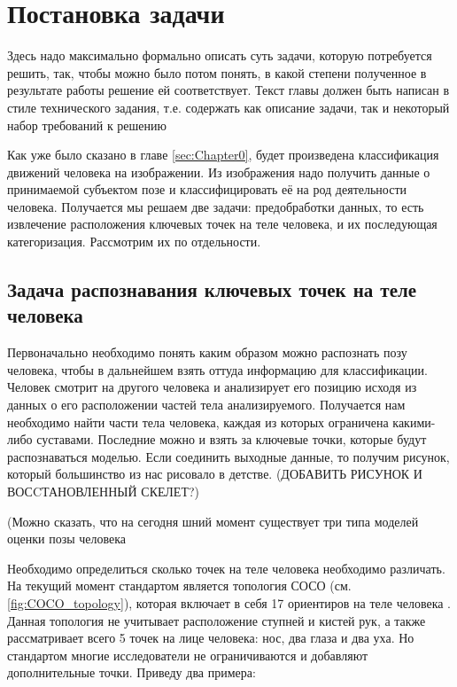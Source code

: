 \section{Постановка задачи}
\label{sec:Chapter1} 
Здесь надо максимально формально описать суть задачи, которую потребуется решить, так, чтобы можно было потом понять, в какой степени полученное в результате работы решение ей соответствует. Текст главы должен быть написан в стиле технического задания, т.е. содержать как описание задачи, так и некоторый набор требований к решению

Как уже было сказано в главе \ref{sec:Chapter0}, будет произведена классификация движений человека на изображении. Из изображения надо получить данные о принимаемой субъектом позе и классифицировать её на род деятельности человека. Получается мы решаем две задачи: предобработки данных, то есть извлечение расположения ключевых точек на теле человека, и их последующая категоризация. Рассмотрим их по отдельности.


\subsection{Задача распознавания ключевых точек на теле человека}
\label{subsec:Theory of keypoint detection}

Первоначально необходимо понять каким образом можно распознать позу человека, чтобы в дальнейшем взять оттуда информацию для классификации. Человек смотрит на другого человека и анализирует его позицию исходя из данных о его расположении частей тела анализируемого. Получается нам необходимо найти части тела человека, каждая из которых ограничена какими-либо суставами. Последние можно и взять за ключевые точки, которые будут распознаваться моделью. Если соединить выходные данные, то получим рисунок, который большинство из нас рисовало в детстве. (ДОБАВИТЬ РИСУНОК И ВОСCТАНОВЛЕННЫЙ СКЕЛЕТ?)

(Можно сказать, что на сегодня шний момент существует три типа моделей оценки позы человека

Необходимо определиться сколько точек на теле человека необходимо различать. На текущий момент стандартом является топология СОСО (см. \autoref{fig:COCO_topology}), которая включает в себя 17 ориентиров на теле человека \cite{COCO_topology, COCO_dataset}. Данная топология не учитывает расположение ступней и кистей рук, а также рассматривает всего 5 точек на лице человека: нос, два глаза и два уха. Но стандартом многие исследователи не ограничиваются и добавляют дополнительные точки. Приведу два примера:

